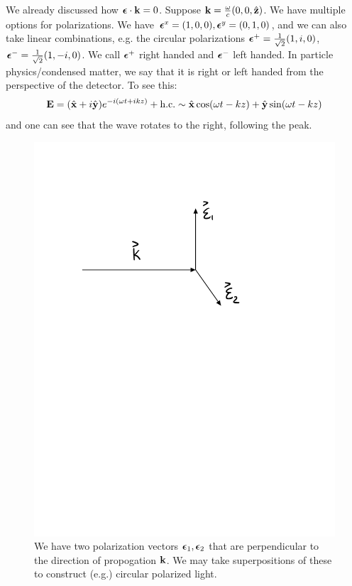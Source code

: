 We already discussed how $\mbox{\boldmath$ \epsilon $} \cdot \mathbf{k} = 0$. Suppose $\mathbf{k} = \frac{\omega}{c}(0, 0, \hat{\mathbf{z}})$. We have multiple options for polarizations. We have $\mbox{\boldmath$ \epsilon $}^x = (1, 0, 0), \mbox{\boldmath$ \epsilon $}^y = (0, 1, 0)$, and we can also take linear combinations, e.g. the circular polarizations $\mbox{\boldmath$ \epsilon $}^+ = \frac{1}{\sqrt{2}}(1, i, 0)$, $\mbox{\boldmath$ \epsilon $}^- = \frac{1}{\sqrt{2}}(1, -i, 0)$. We call $\mbox{\boldmath$ \epsilon $}^+$ right handed and $\mbox{\boldmath$ \epsilon $}^-$ left handed. In particle physics/condensed matter, we say that it is right or left handed from the perspective of the detector. To see this:
\begin{equation}
    \mathbf{E} = (\hat{\mathbf{x}} + i\hat{\mathbf{y}})e^{-i(\omega t + ikz)} + \text{h.c.} \sim \hat{\mathbf{x}}\cos(\omega t - kz) + \hat{\mathbf{y}}\sin(\omega t - kz)
\end{equation}
and one can see that the wave rotates to the right, following the peak.

\begin{figure}[htbp]
    \centering
    \includegraphics[scale=0.6]{Images/fig-photonpolarizations.pdf}
    \caption{We have two polarization vectors $\mbox{\boldmath$ \epsilon $}_1, \mbox{\boldmath$ \epsilon $}_2$ that are perpendicular to the direction of propogation $\mathbf{k}$. We may take superpositions of these to construct (e.g.) circular polarized light.}
    \label{fig-photonpolarizations}
\end{figure}

